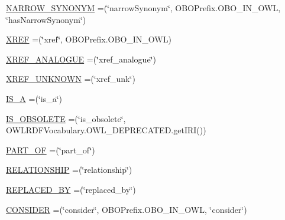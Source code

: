 \begin{DoxyCompactItemize}
\item 
\hyperlink{enumorg_1_1coode_1_1owlapi_1_1obo_1_1parser_1_1_o_b_o_vocabulary_a65aea8044f276bcef61554bf71480d5a}{N\-A\-R\-R\-O\-W\-\_\-\-S\-Y\-N\-O\-N\-Y\-M} =(\char`\"{}narrow\-Synonym\char`\"{}, O\-B\-O\-Prefix.\-O\-B\-O\-\_\-\-I\-N\-\_\-\-O\-W\-L, \char`\"{}has\-Narrow\-Synonym\char`\"{})
\item 
\hyperlink{enumorg_1_1coode_1_1owlapi_1_1obo_1_1parser_1_1_o_b_o_vocabulary_a92e43f9151727e7a22eab3a3a94938c3}{X\-R\-E\-F} =(\char`\"{}xref\char`\"{}, O\-B\-O\-Prefix.\-O\-B\-O\-\_\-\-I\-N\-\_\-\-O\-W\-L)
\item 
\hyperlink{enumorg_1_1coode_1_1owlapi_1_1obo_1_1parser_1_1_o_b_o_vocabulary_afe9aa30fd21b0145f4a657b5dfac42ca}{X\-R\-E\-F\-\_\-\-A\-N\-A\-L\-O\-G\-U\-E} =(\char`\"{}xref\-\_\-analogue\char`\"{})
\item 
\hyperlink{enumorg_1_1coode_1_1owlapi_1_1obo_1_1parser_1_1_o_b_o_vocabulary_af8032c4e481391a21585d7afd20c8006}{X\-R\-E\-F\-\_\-\-U\-N\-K\-N\-O\-W\-N} =(\char`\"{}xref\-\_\-unk\char`\"{})
\item 
\hyperlink{enumorg_1_1coode_1_1owlapi_1_1obo_1_1parser_1_1_o_b_o_vocabulary_a3288ad2ed8900d59725704b7ecea814c}{I\-S\-\_\-\-A} =(\char`\"{}is\-\_\-a\char`\"{})
\item 
\hyperlink{enumorg_1_1coode_1_1owlapi_1_1obo_1_1parser_1_1_o_b_o_vocabulary_a7d9dc06730e112c9b4502b095d38728e}{I\-S\-\_\-\-O\-B\-S\-O\-L\-E\-T\-E} =(\char`\"{}is\-\_\-obsolete\char`\"{}, O\-W\-L\-R\-D\-F\-Vocabulary.\-O\-W\-L\-\_\-\-D\-E\-P\-R\-E\-C\-A\-T\-E\-D.\-get\-I\-R\-I())
\item 
\hyperlink{enumorg_1_1coode_1_1owlapi_1_1obo_1_1parser_1_1_o_b_o_vocabulary_a38bad1a69a7e9429ea491c6924d69c52}{P\-A\-R\-T\-\_\-\-O\-F} =(\char`\"{}part\-\_\-of\char`\"{})
\item 
\hyperlink{enumorg_1_1coode_1_1owlapi_1_1obo_1_1parser_1_1_o_b_o_vocabulary_a02bd09195f39bf7ec78e3d585f409f82}{R\-E\-L\-A\-T\-I\-O\-N\-S\-H\-I\-P} =(\char`\"{}relationship\char`\"{})
\item 
\hyperlink{enumorg_1_1coode_1_1owlapi_1_1obo_1_1parser_1_1_o_b_o_vocabulary_a3ea1db3457f7676d68232fe441b49b7c}{R\-E\-P\-L\-A\-C\-E\-D\-\_\-\-B\-Y} =(\char`\"{}replaced\-\_\-by\char`\"{})
\item 
\hyperlink{enumorg_1_1coode_1_1owlapi_1_1obo_1_1parser_1_1_o_b_o_vocabulary_a8ad91dc4454f4f0f353fc1c5f6742dd8}{C\-O\-N\-S\-I\-D\-E\-R} =(\char`\"{}consider\char`\"{}, O\-B\-O\-Prefix.\-O\-B\-O\-\_\-\-I\-N\-\_\-\-O\-W\-L, \char`\"{}consider\char`\"{})
\item 

\end{DoxyCompactItemize}
